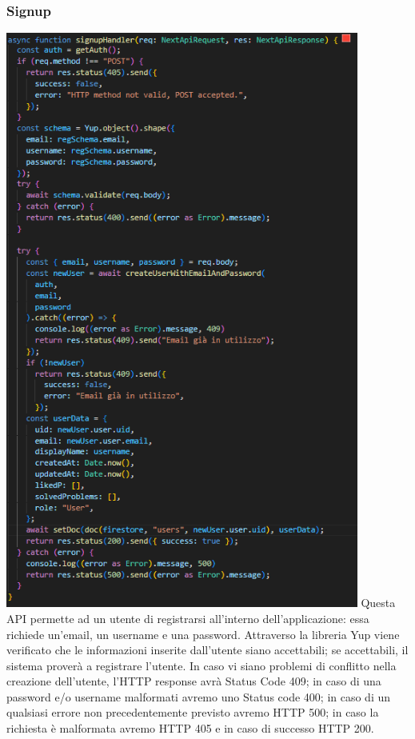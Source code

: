 \documentclass[11pt, a4paper]{article}
\theoremstyle{definition}
\begin{document}
\subsubsection{Signup}
\includegraphics[width=\textwidth,height=19cm]{materiale/API/signup.png}
Questa API permette ad un utente di registrarsi all'interno dell'applicazione: essa richiede un'email, un username e una password.
Attraverso la libreria Yup viene verificato che le informazioni inserite dall'utente siano accettabili; se accettabili, il sistema proverà a registrare l'utente.
In caso vi siano problemi di conflitto nella creazione dell'utente, l'HTTP response avrà Status Code 409; in caso di una password e/o username malformati avremo uno Status code 400;
in caso di un qualsiasi errore non precedentemente previsto avremo HTTP 500; in caso la richiesta è malformata avremo HTTP 405 e in caso di successo HTTP 200.
\end{document}

